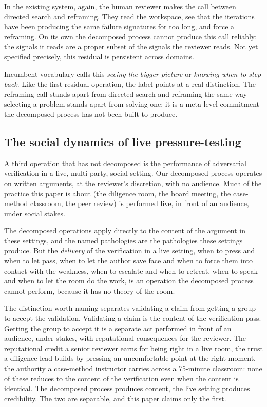 \documentclass[
  11pt,
]{article}
\begin{document}
In the existing system, again, the human reviewer makes the call between
directed search and reframing. They read the workspace, see that the
iterations have been producing the same failure signatures for too long,
and force a reframing. On its own the decomposed process cannot produce
this call reliably: the signals it reads are a proper subset of the
signals the reviewer reads. Not yet specified precisely, this residual is
persistent across domains.

Incumbent vocabulary calls this \emph{seeing the bigger picture} or
\emph{knowing when to step back}. Like the first residual operation, the
label points at a real distinction. The reframing call stands apart from
directed search and reframing the same way selecting a problem stands
apart from solving one: it is a meta-level commitment the decomposed
process has not been built to produce.

\subsection{The social dynamics of live
pressure-testing}\label{the-social-dynamics-of-live-pressure-testing}

A third operation that has not decomposed is the performance of
adversarial verification in a live, multi-party, social setting. Our
decomposed process operates on written arguments, at the reviewer's
discretion, with no audience. Much of the practice this paper is about
(the diligence room, the board meeting, the case-method classroom, the
peer review) is performed live, in front of an audience, under social
stakes.

The decomposed operations apply directly to the content of the argument in
these settings, and the named pathologies are the pathologies these
settings produce. But the \emph{delivery} of the verification in a live
setting, when to press and when to let pass, when to let the author
save face and when to force them into contact with the weakness, when to
escalate and when to retreat, when to speak and when to let the room do
the work, is an operation the decomposed process cannot perform,
because it has no theory of the room.

The distinction worth naming separates validating a claim from getting a
group to accept the validation. Validating a claim is the content of the
verification pass. Getting the group to accept it is a separate act
performed in front of an audience, under stakes, with reputational
consequences for the reviewer. The reputational credit a senior reviewer
earns for being right in a live room, the trust a diligence lead builds by
pressing an uncomfortable point at the right moment, the authority a
case-method instructor carries across a 75-minute classroom: none of these
reduces to the content of the verification even when the content is
identical. The decomposed process produces content, the live setting
produces credibility. The two are separable, and this paper claims only
the first.
\end{document}
